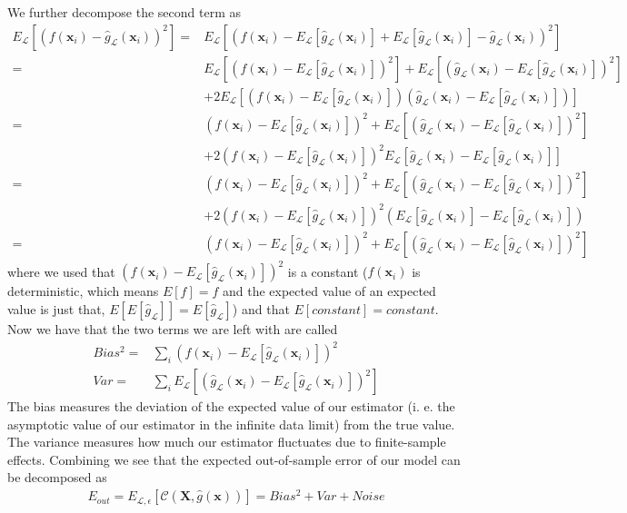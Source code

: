 \documentclass[norsk,a4paper,11pt]{article}
\begin{document}
	We further decompose the second term as
	{\tiny
	\begin{align}
		E_\mathcal{L} [(f(\mathbf{x}_i) - \hat{g}_\mathcal{L}(\mathbf{x}_i))^2]
		=& E_\mathcal{L} [(f(\mathbf{x}_i) -E_\mathcal{L}[\hat{g}_\mathcal{L}(\mathbf{x}_i)] + E_\mathcal{L}[\hat{g}_\mathcal{L}(\mathbf{x}_i)] - \hat{g}_\mathcal{L}(\mathbf{x}_i))^2] \\
		=& E_\mathcal{L} [(f(\mathbf{x}_i) -E_\mathcal{L}[\hat{g}_\mathcal{L}(\mathbf{x}_i)])^2] + E_\mathcal{L}[(\hat{g}_\mathcal{L}(\mathbf{x}_i) - E_\mathcal{L}[\hat{g}_\mathcal{L}(\mathbf{x}_i)])^2] \nonumber \\
		&+ 2E_\mathcal{L} [(f(\mathbf{x}_i) - E_\mathcal{L}[\hat{g}_\mathcal{L}(\mathbf{x}_i)])(\hat{g}_\mathcal{L}(\mathbf{x}_i) - E_\mathcal{L}[\hat{g}_\mathcal{L}(\mathbf{x}_i)])] \\
		=& (f(\mathbf{x}_i) -E_\mathcal{L}[\hat{g}_\mathcal{L}(\mathbf{x}_i)])^2 + E_\mathcal{L}[(\hat{g}_\mathcal{L}(\mathbf{x}_i) - E_\mathcal{L}[\hat{g}_\mathcal{L}(\mathbf{x}_i)])^2] \nonumber \\
		&+ 2(f(\mathbf{x}_i) -E_\mathcal{L}[\hat{g}_\mathcal{L}(\mathbf{x}_i)])^2 E_\mathcal{L} [\hat{g}_\mathcal{L}(\mathbf{x}_i) - E_\mathcal{L}[\hat{g}_\mathcal{L}(\mathbf{x}_i)]] \\
		=& (f(\mathbf{x}_i) -E_\mathcal{L}[\hat{g}_\mathcal{L}(\mathbf{x}_i)])^2 + E_\mathcal{L}[(\hat{g}_\mathcal{L}(\mathbf{x}_i) - E_\mathcal{L}[\hat{g}_\mathcal{L}(\mathbf{x}_i)])^2] \nonumber \\
		&+ 2(f(\mathbf{x}_i) -E_\mathcal{L}[\hat{g}_\mathcal{L}(\mathbf{x}_i)])^2 (E_\mathcal{L} [\hat{g}_\mathcal{L}(\mathbf{x}_i)] - E_\mathcal{L}[\hat{g}_\mathcal{L}(\mathbf{x}_i)]) \\
		=& (f(\mathbf{x}_i) -E_\mathcal{L}[\hat{g}_\mathcal{L}(\mathbf{x}_i)])^2
		+ E_\mathcal{L}[(\hat{g}_\mathcal{L}(\mathbf{x}_i) - E_\mathcal{L}[\hat{g}_\mathcal{L}(\mathbf{x}_i)])^2] 
	\end{align}}
	where we used that $(f(\mathbf{x}_i) -E_\mathcal{L}[\hat{g}_\mathcal{L}(\mathbf{x}_i)])^2$ is a constant ($f(\mathbf{x}_i)$ is deterministic, which means $E[f]=f$ and the expected value of an expected value is just that, $E[E[\hat{g}_\mathcal{L}]] = E[\hat{g}_\mathcal{L}]$) and that $E[constant] = constant$.
	Now we have that the two terms we are left with are called
	\begin{align}
		Bias^2 =& \sum_i (f(\mathbf{x}_i) -E_\mathcal{L}[\hat{g}_\mathcal{L}(\mathbf{x}_i)])^2 \\
		Var =& \sum_i E_\mathcal{L}[(\hat{g}_\mathcal{L}(\mathbf{x}_i) - E_\mathcal{L}[\hat{g}_\mathcal{L}(\mathbf{x}_i)])^2] 
	\end{align}
	The bias measures the deviation of the expected value of our estimator (i. e. the asymptotic value of our estimator in the infinite data limit) from the true value. The variance measures how much our estimator fluctuates due to finite-sample effects. Combining we see that the expected out-of-sample error of our model can be decomposed as
	\begin{align}
		E_{out} = E_{\mathcal{L}, \epsilon} [\mathcal{C}(\mathbf{X}, \hat{g}(\mathbf{x}))] = Bias^2 + Var + Noise
	\end{align}
\end{document}
